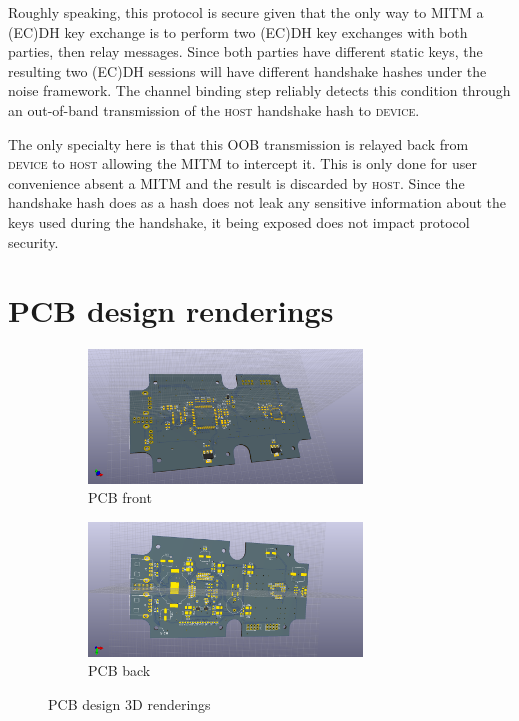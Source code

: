 \documentclass[12pt,a4paper,notitlepage]{article}
\begin{document}
Roughly speaking, this protocol is secure given that the only way to MITM a (EC)DH key exchange is to perform two (EC)DH key exchanges with both parties, then relay messages. Since both parties have different static keys, the resulting two (EC)DH sessions will have different handshake hashes under the noise framework. The channel binding step reliably detects this condition through an out-of-band transmission of the \textsc{host} handshake hash to \textsc{device}.

The only specialty here is that this OOB transmission is relayed back from \textsc{device} to \textsc{host} allowing the MITM to intercept it. This is only done for user convenience absent a MITM and the result is discarded by \textsc{host}. Since the handshake hash does as a hash does not leak any sensitive information about the keys used during the handshake, it being exposed does not impact protocol security.

\section{PCB design renderings}
\label{ch:renderings}

\begin{figure}[H]
    \centering
    \begin{subfigure}[b]{0.8\textwidth}
        \centering
        \includegraphics[width=0.8\textwidth]{pcb_front.png}
        \caption{PCB front}
    \end{subfigure} %
    \begin{subfigure}[b]{0.8\textwidth}
        \centering
        \includegraphics[width=0.8\textwidth]{pcb_back.png}
        \caption{PCB back}
    \end{subfigure}
    \caption{PCB design 3D renderings}
    \label{fig:pcb3d}
\end{figure}
\end{document}

